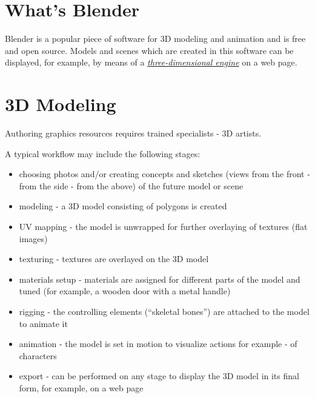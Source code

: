 \documentclass[a4paper,12pt,oneside]{sphinxmanual}
\begin{document}

\section{What's Blender}
\label{about:index-6}\label{about:about-blender}\label{about:blender}
Blender is a popular piece of software for 3D modeling and animation and is free and open source. Models and scenes which are created in this software can be displayed, for example, by means of a {\hyperref[about:about-graphics-engine]{\emph{three-dimensional engine}}} on a web page.


\section{3D Modeling}
\label{about:about-modelling}\label{about:index-7}\label{about:d}
Authoring graphics resources requires trained specialists - 3D artists.

A typical workflow may include the following stages:
\begin{itemize}
\item {} 
choosing photos and/or creating concepts and sketches (views from the front - from the side - from the above) of the future model or scene

\item {} 
modeling - a 3D model consisting of polygons is created

\item {} 
UV mapping - the model is unwrapped for further overlaying of textures (flat images)

\item {} 
texturing - textures are overlayed on the 3D model

\item {} 
materials setup - materials are assigned for different parts of the model and tuned (for example, a wooden door with a metal handle)

\item {} 
rigging - the controlling elements (``skeletal bones'') are attached to the model to animate it

\item {} 
animation - the model is set in motion to visualize actions for example - of characters

\item {} 
export - can be performed on any stage to display the 3D model in its final form, for example, on a web page

\end{itemize}
\end{document}
